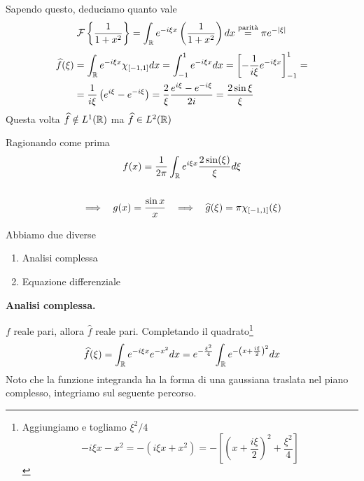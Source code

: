 Sapendo questo, deduciamo quanto vale
\begin{equation*}
\mathcal{F} \left\{\frac{1}{1 + x^{2}}\right\} = \int _{\mathbb{R} } e^{ - i\xi x}\left(\frac{1}{1 + x^{2}}\right) dx\overset{\text{parità}}{ = } \pi e^{ - | \xi | }
\end{equation*}
\Soluzione
\begin{equation*}
\begin{aligned}
\widehat{f} (\xi) & = \int _{\mathbb{R} } e^{ - i\xi x} \chi _{[ - 1,1]} dx = \int ^{1}_{ - 1} e^{ - i\xi x} dx = \left[ - \frac{1}{i\xi } e^{ - i\xi x}\right]^{1}_{ - 1} = \\
 & = \frac{1}{i\xi }\left(e^{i\xi } - e^{ - i\xi }\right) = \frac{2}{\xi }\frac{e^{i\xi } - e^{ - i\xi }}{2i} = \frac{2\sin \xi }{\xi }
\end{aligned}
\end{equation*}
Questa volta $\widehat{f} \notin L^{1} (\mathbb{R})$ ma $\widehat{f} \in L^{2} (\mathbb{R})$

Ragionando come prima
\begin{gather*}
f(x) = \frac{1}{2\pi }\int _{\mathbb{R} } e^{i\xi x}\frac{2\sin(\xi)}{\xi } d\xi \\
\\
\implies \ \ g(x) = \frac{\sin x}{x} \ \ \implies \ \ \widehat{g}(\xi) = \pi \chi _{[ - 1,1]} (\xi)
\end{gather*}
\Soluzione

Abbiamo due diverse
\begin{enumerate}
\item Analisi complessa
\item Equazione differenziale
\end{enumerate}

\textbf{Analisi complessa.}

$f$ reale pari, allora $\hat{f}$ reale pari. Completando il quadrato\footnote{Aggiungiamo e togliamo $\xi ^{2} /4$
\begin{equation*}
- i\xi x - x^{2} = - \left(i\xi x + x^{2}\right) = - \left[\left(x + \frac{i\xi }{2}\right)^{2} + \frac{\xi ^{2}}{4}\right]
\end{equation*}
}
\begin{equation*}
\widehat{f} (\xi) = \int _{\mathbb{R} } e^{ - i\xi x} e^{ - x^{2}} dx = e^{ - \frac{\xi ^{2}}{4}}\int _{\mathbb{R} } e^{ - \left(x + \frac{i\xi }{2}\right)^{2}} dx
\end{equation*}
Noto che la funzione integranda ha la forma di una gaussiana traslata nel piano complesso, integriamo sul seguente percorso.


